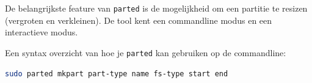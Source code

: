 De belangrijkste feature van \texttt{parted} is de mogelijkheid om een partitie te resizen (vergroten en verkleinen). De tool kent een commandline modus en een interactieve modus.

Een syntax overzicht van hoe je \texttt{parted} kan gebruiken op de commandline:
\begin{lstlisting}[language=bash]
sudo parted mkpart part-type name fs-type start end
\end{lstlisting}

